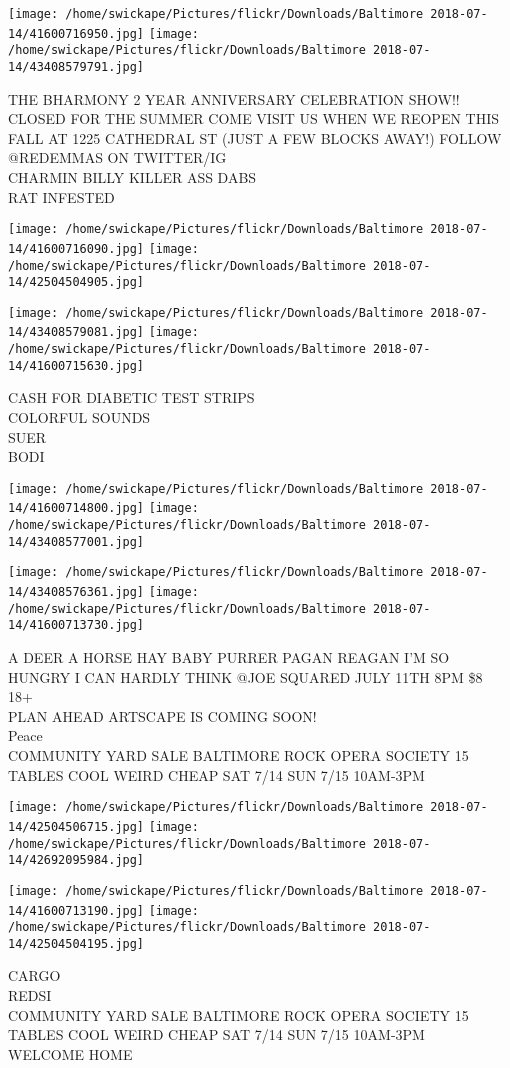 \documentclass[10pt,letterpaper]{article}
\begin{document}
\texttt{[image: /home/swickape/Pictures/flickr/Downloads/Baltimore 2018-07-14/41600716950.jpg]}
\texttt{[image: /home/swickape/Pictures/flickr/Downloads/Baltimore 2018-07-14/43408579791.jpg]}

THE BHARMONY 2 YEAR ANNIVERSARY CELEBRATION SHOW!!\\
CLOSED FOR THE SUMMER COME VISIT US WHEN WE REOPEN THIS FALL AT 1225 CATHEDRAL ST (JUST A FEW BLOCKS AWAY!) FOLLOW @REDEMMAS ON TWITTER/IG\\
CHARMIN BILLY KILLER ASS DABS\\
RAT INFESTED
\pagebreak

\texttt{[image: /home/swickape/Pictures/flickr/Downloads/Baltimore 2018-07-14/41600716090.jpg]}
\texttt{[image: /home/swickape/Pictures/flickr/Downloads/Baltimore 2018-07-14/42504504905.jpg]}

\texttt{[image: /home/swickape/Pictures/flickr/Downloads/Baltimore 2018-07-14/43408579081.jpg]}
\texttt{[image: /home/swickape/Pictures/flickr/Downloads/Baltimore 2018-07-14/41600715630.jpg]}

CASH FOR DIABETIC TEST STRIPS\\
COLORFUL SOUNDS\\
SUER\\
BODI
\pagebreak

\texttt{[image: /home/swickape/Pictures/flickr/Downloads/Baltimore 2018-07-14/41600714800.jpg]}
\texttt{[image: /home/swickape/Pictures/flickr/Downloads/Baltimore 2018-07-14/43408577001.jpg]}

\texttt{[image: /home/swickape/Pictures/flickr/Downloads/Baltimore 2018-07-14/43408576361.jpg]}
\texttt{[image: /home/swickape/Pictures/flickr/Downloads/Baltimore 2018-07-14/41600713730.jpg]}

A DEER A HORSE HAY BABY PURRER PAGAN REAGAN I'M SO HUNGRY I CAN HARDLY THINK @JOE SQUARED JULY 11TH 8PM \$8 18+\\
PLAN AHEAD ARTSCAPE IS COMING SOON!\\
Peace\\
COMMUNITY YARD SALE BALTIMORE ROCK OPERA SOCIETY 15 TABLES COOL WEIRD CHEAP SAT 7/14 SUN 7/15 10AM{-}3PM
\pagebreak

\texttt{[image: /home/swickape/Pictures/flickr/Downloads/Baltimore 2018-07-14/42504506715.jpg]}
\texttt{[image: /home/swickape/Pictures/flickr/Downloads/Baltimore 2018-07-14/42692095984.jpg]}

\texttt{[image: /home/swickape/Pictures/flickr/Downloads/Baltimore 2018-07-14/41600713190.jpg]}
\texttt{[image: /home/swickape/Pictures/flickr/Downloads/Baltimore 2018-07-14/42504504195.jpg]}

CARGO\\
REDSI\\
COMMUNITY YARD SALE BALTIMORE ROCK OPERA SOCIETY 15 TABLES COOL WEIRD CHEAP SAT 7/14 SUN 7/15 10AM{-}3PM\\
WELCOME HOME
\pagebreak
\end{document}
